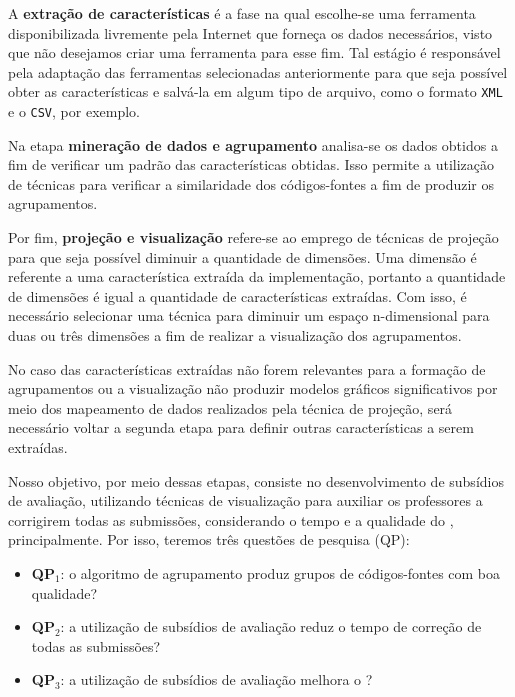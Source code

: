 	A \textbf{extração de características} é a fase na qual escolhe-se uma ferramenta
	disponibilizada livremente pela Internet que forneça os dados necessários, visto
	que não desejamos criar uma ferramenta para esse fim. Tal estágio é responsável pela
	adaptação das ferramentas selecionadas anteriormente para que seja possível obter
	as características e salvá-la em algum tipo de arquivo, como o formato \texttt{XML}
	e o \texttt{CSV}, por exemplo.

	Na etapa \textbf{mineração de dados e agrupamento} analisa-se os dados obtidos a
	fim de verificar um padrão das características obtidas. Isso permite a utilização
	de técnicas para verificar a similaridade dos códigos-fontes a fim
	de produzir os agrupamentos.
	
	Por fim, \textbf{projeção e visualização} refere-se ao emprego de técnicas de
	projeção para que seja possível diminuir a quantidade de dimensões. Uma dimensão
	é referente a uma característica extraída da implementação, portanto a quantidade
	de dimensões é igual a quantidade de características extraídas. Com isso, é
	necessário selecionar uma técnica para diminuir um espaço n-dimensional para
	duas ou três dimensões a fim de realizar a visualização dos agrupamentos.
	
	No caso das características extraídas não forem relevantes para a formação de
	agrupamentos ou a visualização não produzir modelos gráficos significativos por
	meio dos mapeamento de dados realizados pela técnica de projeção, será necessário
	voltar a segunda etapa para definir outras características a serem extraídas.
	
	Nosso objetivo, por meio dessas etapas, consiste no desenvolvimento de subsídios
	de avaliação, utilizando técnicas de visualização para auxiliar os professores a
	corrigirem todas as submissões, considerando o tempo e a qualidade do ,
	principalmente. Por isso, teremos três questões de pesquisa (QP):
	
	\begin{itemize}
		\item \textbf{QP$_1$}: o algoritmo de agrupamento produz grupos de códigos-fontes
		com boa qualidade?
		\item \textbf{QP$_2$}: a utilização de subsídios de avaliação reduz o tempo
		de correção de todas as submissões?
		\item \textbf{QP$_3$}: a utilização de subsídios de avaliação melhora o ?
	\end{itemize}
	
